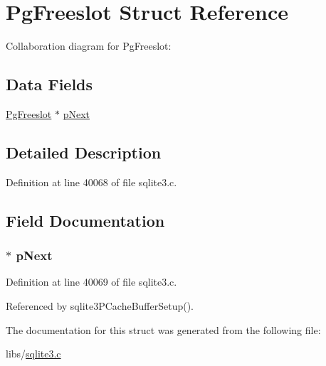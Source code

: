 \hypertarget{struct_pg_freeslot}{}\section{Pg\+Freeslot Struct Reference}
\label{struct_pg_freeslot}


Collaboration diagram for Pg\+Freeslot\+:
\subsection*{Data Fields}
\begin{DoxyCompactItemize}
\item 
\hyperlink{struct_pg_freeslot}{Pg\+Freeslot} $\ast$ \hyperlink{struct_pg_freeslot_a1dd3aeccffbd60b4016e26f0904e0d0a}{p\+Next}
\end{DoxyCompactItemize}


\subsection{Detailed Description}


Definition at line 40068 of file sqlite3.\+c.



\subsection{Field Documentation}
\hypertarget{struct_pg_freeslot_a1dd3aeccffbd60b4016e26f0904e0d0a}{}
\subsubsection[{p\+Next}]{$\ast$ p\+Next}\label{struct_pg_freeslot_a1dd3aeccffbd60b4016e26f0904e0d0a}


Definition at line 40069 of file sqlite3.\+c.



Referenced by sqlite3\+P\+Cache\+Buffer\+Setup().



The documentation for this struct was generated from the following file\+:\begin{DoxyCompactItemize}
\item 
libs/\hyperlink{sqlite3_8c}{sqlite3.\+c}\end{DoxyCompactItemize}
